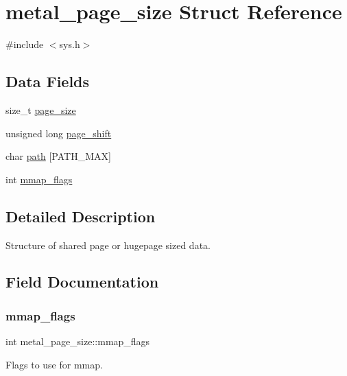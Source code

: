 \hypertarget{structmetal__page__size}{}\section{metal\+\_\+page\+\_\+size Struct Reference}
\label{structmetal__page__size}


{\ttfamily \#include $<$sys.\+h$>$}

\subsection*{Data Fields}
\begin{DoxyCompactItemize}
\item 
size\+\_\+t \hyperlink{structmetal__page__size_a97c5f203beaedb46b0d52425e5445a08}{page\+\_\+size}
\item 
unsigned long \hyperlink{structmetal__page__size_a990ff70e16c6efaaf58e47b0948d23a7}{page\+\_\+shift}
\item 
char \hyperlink{structmetal__page__size_aea1125ee871f2ddaca6580fc78985113}{path} \mbox{[}P\+A\+T\+H\+\_\+\+M\+AX\mbox{]}
\item 
int \hyperlink{structmetal__page__size_ad397236c18313e189cb99b31bad74750}{mmap\+\_\+flags}
\end{DoxyCompactItemize}


\subsection{Detailed Description}
Structure of shared page or hugepage sized data. 

\subsection{Field Documentation}
\mbox{\label{structmetal__page__size_ad397236c18313e189cb99b31bad74750}} 
\subsubsection{\texorpdfstring{mmap\+\_\+flags}{mmap\_flags}}
{\footnotesize\ttfamily int metal\+\_\+page\+\_\+size\+::mmap\+\_\+flags}

Flags to use for mmap. \mbox{\label{structmetal__page__size_a990ff70e16c6efaaf58e47b0948d23a7}} 
